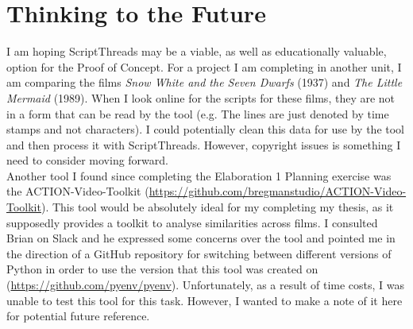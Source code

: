 \documentclass{article}
\begin{document}
\section{Thinking to the Future}
I am hoping ScriptThreads may be a viable, as well as educationally valuable, option for the Proof of Concept. For a project I am completing in another unit, I am comparing the films \textit{Snow White and the Seven Dwarfs} (1937) and \textit{The Little Mermaid} (1989). When I look online for the scripts for these films, they are not in a form that can be read by the tool (e.g. The lines are just denoted by time stamps and not characters). I could potentially clean this data for use by the tool and then process it with ScriptThreads. However, copyright issues is something I need to consider moving forward.\\

Another tool I found since completing the Elaboration 1 Planning exercise was the ACTION-Video-Toolkit (\url{https://github.com/bregmanstudio/ACTION-Video-Toolkit}). This tool would be absolutely ideal for my completing my thesis, as it supposedly provides a toolkit to analyse similarities across films. I consulted Brian on Slack and he expressed some concerns over the tool and pointed me in the direction of a GitHub repository for switching between different versions of Python in order to use the version that this tool was created on (\url{https://github.com/pyenv/pyenv}). Unfortunately, as a result of time costs, I was unable to test this tool for this task. However, I wanted to make a note of it here for potential future reference.\\
\end{document}
